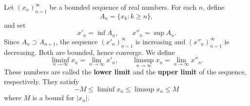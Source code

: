 Let $(x_n)_{n=1}^{\infty}$ be a bounded sequence of real numbers. For each $n$, define
$$A_n = \{ x_k : k \geq n \},$$
and set
$$x'_n = \inf A_n, \qquad x''_n = \sup A_n.$$
Since $A_n \supset A_{n+1}$, the sequence $(x'_n)_{n=1}^{\infty}$ is increasing and $(x''_n)_{n=1}^{\infty}$ is decreasing. Both are bounded, hence converge. We define
$$\liminf_{n \to \infty} x_n = \lim_{n \to \infty} x'_n, \qquad \limsup_{n \to \infty} x_n = \lim_{n \to \infty} x''_n.$$
These numbers are called the \textbf{lower limit} and the \textbf{upper limit} of the sequence, respectively. They satisfy
$$-M \leq \liminf x_n \leq \limsup x_n \leq M$$
where $M$ is a bound for $|x_n|$.
